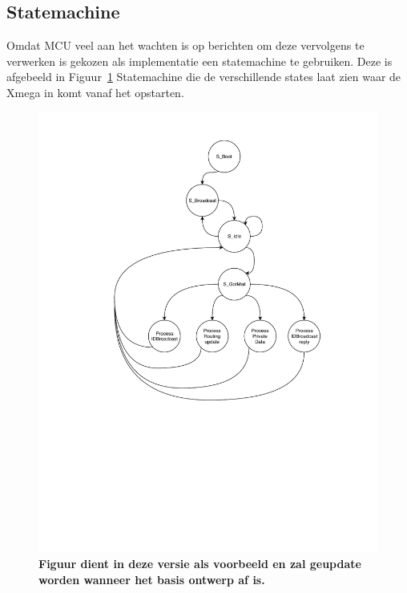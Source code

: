 \documentclass[a4paper, 11pt]{article}
\begin{document}
\subsection{Statemachine}
Omdat MCU veel aan het wachten is op berichten om deze vervolgens te verwerken is gekozen als implementatie een statemachine te gebruiken. Deze is afgebeeld in Figuur~\ref{fig:Statemachine} 
Statemachine die de verschillende states laat zien waar de Xmega in komt vanaf het opstarten.
\begin{figure}[!h]
	\includegraphics[width=.8\textwidth, keepaspectratio]{media/Pstate.pdf}
    \caption{ \textbf{Figuur dient in deze versie als voorbeeld en zal geupdate worden wanneer het basis ontwerp af is.}}
    \label{fig:Statemachine}
\end{figure}
\newpage


 
\end{document}
